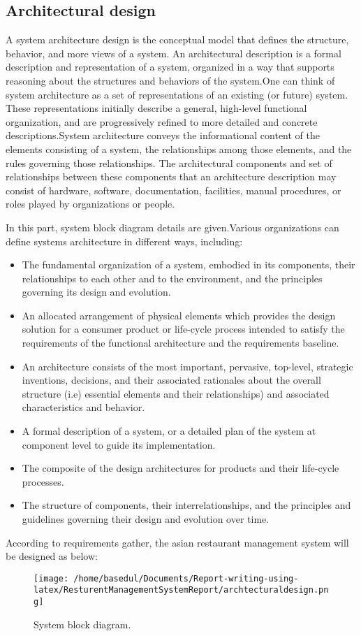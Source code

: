 \documentclass[12pt,a4paper]{article}
\newcommand\tab[1][.7cm]{\hspace*{#1}}
\begin{document}
\subsection{Architectural design}
\tab A system architecture \cite{Ref:12} design is the conceptual model that defines the structure, behavior, and more views of a system. An architectural description is a formal description and representation of a system, organized in a way that supports reasoning about the structures and behaviors of the system.One can think of system architecture as a set of representations of an existing (or future) system. These representations initially describe a general, high-level functional organization, and are progressively refined to more detailed and concrete descriptions.System architecture conveys the informational content of the elements consisting of a system, the relationships among those elements, and the rules governing those relationships. The architectural components and set of relationships between these components that an architecture description may consist of hardware, software, documentation, facilities, manual procedures, or roles played by organizations or people.{In this part, system block diagram details are given.Various organizations can define systems architecture in different ways, including:\begin{itemize}
	\item The fundamental organization of a system, embodied in its components, their relationships to each other and to the environment, and the principles governing its design and evolution.
	\item An allocated arrangement of physical elements which provides the design solution for a consumer product or life-cycle process intended to satisfy the requirements of the functional architecture and the requirements baseline.
	\item An architecture consists of the most important, pervasive, top-level, strategic inventions, decisions, and their associated rationales about the overall structure (i.e) essential elements and their relationships) and associated characteristics and behavior.
	\item A formal description of a system, or a detailed plan of the system at component level to guide its implementation.
	\item The composite of the design architectures for products and their life-cycle processes.
	\item The structure of components, their interrelationships, and the principles and guidelines governing their design and evolution over time.
\end{itemize}According to requirements
gather, the asian restaurant management system will be designed as below:}
	\begin{figure}[H]
		\centering
		\texttt{[image: /home/basedul/Documents/Report-writing-using-latex/ResturentManagementSystemReport/archtecturaldesign.png]}
		\caption{\hspace{0.35em}System block diagram.}
		\label{fig:archi} 
	\end{figure}
		
\end{document}
